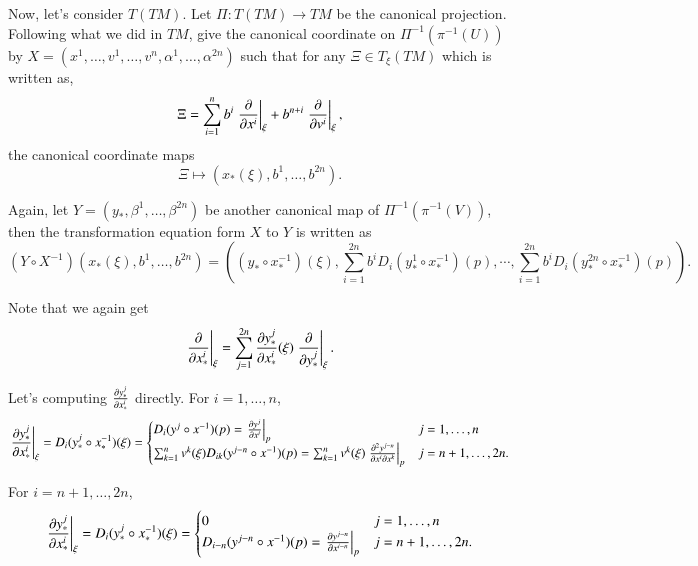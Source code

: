 \documentclass[a4paper, 12pt]{article}
\theoremstyle{Mydefinition}
\theoremstyle{Mytheorem}
\begin{document}
Now, let's consider $T(TM)$. Let $\Pi:T(TM)\rightarrow TM$ be the canonical projection. Following what we did in $TM$, give the canonical coordinate on $\Pi^{-1}(\pi^{-1}(U))$ by $X = (x^1, \ldots, v^1, \ldots, v^n, \alpha^1, \ldots, \alpha^{2n})$ such that for any $\Xi\in T_{\xi}(TM)$ which is written as,
\begin{equation*}
    \Xi = \sum_{i=1}^n b^i \left.\pdv{x^i}\right|_{\xi} + b^{n+i}\left.\pdv{v^i}\right|_{\xi},
\end{equation*}
the canonical coordinate maps
\begin{equation*}
    \Xi\mapsto (x_*(\xi), b^1, \ldots, b^{2n}).
\end{equation*}

Again, let $Y = (y_*, \beta^1, \ldots, \beta^{2n})$ be another canonical map of $\Pi^{-1}(\pi^{-1}(V))$, then the transformation equation form $X$ to $Y$ is written as
\begin{equation*}
    (Y\circ X^{-1})(x_*(\xi), b^1, \ldots, b^{2n}) = \left((y_*\circ x_*^{-1})(\xi), \sum_{i=1}^{2n} b^i D_i(y_*^1\circ x_*^{-1})(p),\cdots, \sum_{i=1}^{2n} b^i D_i(y_*^{2n}\circ x_*^{-1})(p)\right).
\end{equation*}

Note that we again get
\begin{equation*}
    \left.\pdv{x_*^i}\right|_{\xi} = \sum_{j=1}^{2n} \frac{\partial y_*^{j}}{\partial x_*^i}(\xi)\left.\pdv{y_*^j}\right|_{\xi} .
\end{equation*}

Let's computing $\pdv{y_*^{j}}{x_*^i}$ directly. For $i=1,\ldots, n$,
\begin{equation*}
    \left.\pdv{y_*^{j}}{x_*^i}\right|_{\xi} = D_i(y_*^j\circ x_*^{-1})(\xi) =
    \begin{cases}
    D_i(y^j\circ x^{-1})(p) = \left.\pdv{y^j}{x^i}\right|_{p} & j=1,\ldots, n\\
    \sum_{k=1}^n v^k(\xi)D_{ik}(y^{j-n}\circ x^{-1})(p) = \sum_{k=1}^n v^k(\xi)\left.\frac{\partial^2 y^{j-n}}{\partial x^i \partial x^k}\right|_{p} & j=n+1, \ldots, 2n.
    \end{cases}
\end{equation*}

For $i=n+1, \ldots, 2n$,
\begin{equation*}
    \left.\pdv{y_*^{j}}{x_*^i}\right|_{\xi} = D_i(y_*^j\circ x_*^{-1})(\xi) =
    \begin{cases}
    0 & j=1,\ldots, n\\
    D_{i-n}(y^{j-n}\circ x^{-1})(p) = \left.\frac{\partial y^{j-n}}{\partial x^{i-n}}\right|_{p} & j=n+1, \ldots, 2n.
    \end{cases}
\end{equation*}
\end{document}
